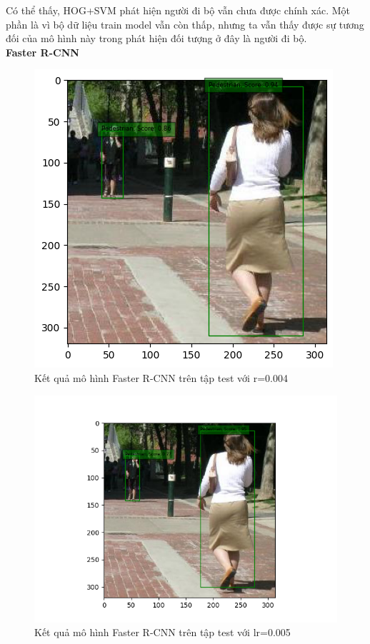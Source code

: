 Có thể thấy, HOG+SVM phát hiện người đi bộ vẫn chưa được chính xác. Một phần là vì bộ dữ liệu train model vẫn còn thấp, nhưng ta vẫn thấy được sự tương đối của mô hình này trong phát hiện đối tượng ở đây là người đi bộ.\\ 

\textbf{Faster R-CNN}
\pagebreak

\begin{figure}[h!]
  \centering
  \includegraphics[scale=0.7]{graphics/test_0004.png}
  \caption{Kết quả mô hình Faster R-CNN trên tập test với r=0.004}
\end{figure}

\begin{figure}[h!]
  \centering
  \includegraphics[scale=0.7]{graphics/test_0005.png}
  \caption{Kết quả mô hình Faster R-CNN trên tập test với lr=0.005}
\end{figure}

